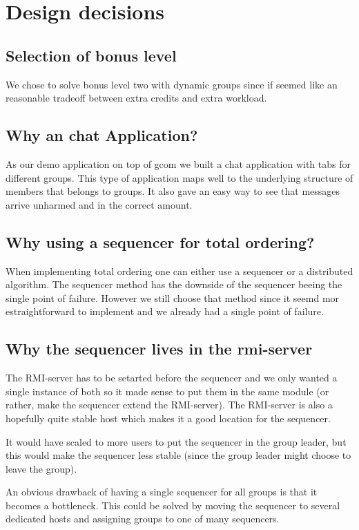 \documentclass[english]{article}
\begin{document}
\section{Design decisions}

\subsection{Selection of bonus level}
We chose to solve bonus level two with dynamic groups since if seemed like an reasonable tradeoff between extra credits and extra workload. 

\subsection{Why an chat Application?}
As our demo application on top of gcom we built a chat application with tabs for different groups. This type of application maps well to the underlying structure of members that belongs to groups. It also gave an easy way to see that messages arrive unharmed and in the correct amount. 

\subsection{Why using a sequencer for total ordering?}
When implementing total ordering one can either use a sequencer or a distributed algorithm. The sequencer method has the downside of the sequencer beeing the single point of failure. However we still choose that method since it seemd mor estraightforward to implement and we already had a single point of failure.

\subsection{Why the sequencer lives in the rmi-server}
The RMI-server has to be setarted before the sequencer and we only wanted a single instance of both so it made sense to put them in the same module (or rather, make the sequencer extend the RMI-server). The RMI-server is also a hopefully quite stable host which makes it a good location for the sequencer.

It would have scaled to more users to put the sequencer in the group leader, but this would make the sequencer less stable (since the group leader might choose to leave the group).

An obvious drawback of having a single sequencer for all groups is that it becomes a bottleneck. This could be solved by moving the sequencer to several dedicated hosts and assigning groups to one of many sequencers.
\end{document}
